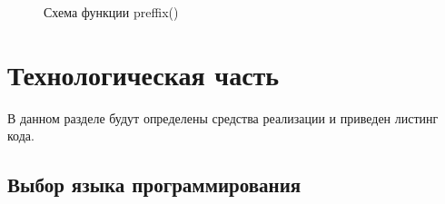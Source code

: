 \documentclass[a4paper,14pt]{report}
\begin{document}
\begin{figure}[h]
\caption{Схема функции preffix()}
\label{fig:image}
\end{figure}


\chapter*{Технологическая часть}

В данном разделе будут определены средства реализации и приведен листинг кода.

\section*{Выбор языка программирования}
\end{document}
